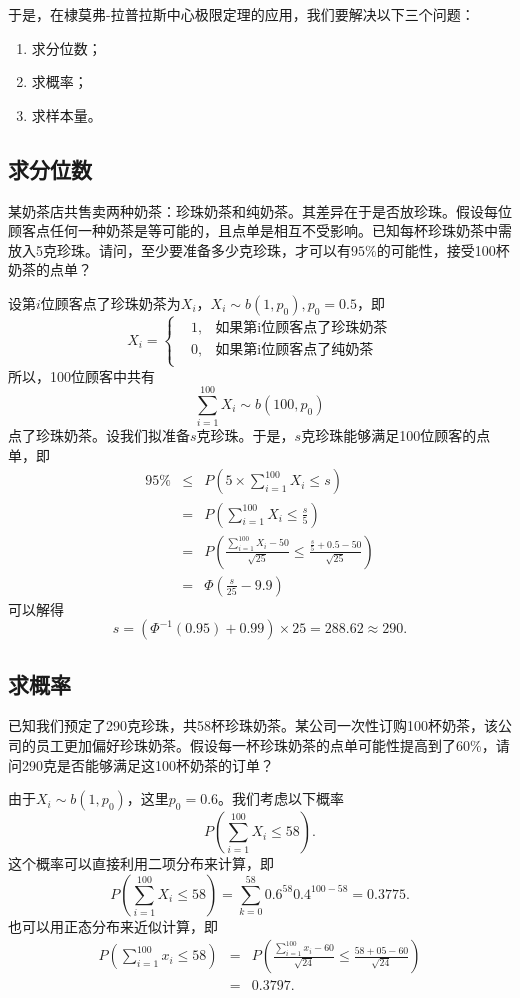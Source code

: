 于是，在棣莫弗-拉普拉斯中心极限定理的应用，我们要解决以下三个问题：
\begin{enumerate}
    \item 求分位数；
    \item 求概率；
    \item 求样本量。
\end{enumerate}
\subsection{求分位数}
\begin{example}
某奶茶店共售卖两种奶茶：珍珠奶茶和纯奶茶。其差异在于是否放珍珠。假设每位顾客点任何一种奶茶是等可能的，且点单是相互不受影响。已知每杯珍珠奶茶中需放入5克珍珠。请问，至少要准备多少克珍珠，才可以有$95\%$的可能性，接受100杯奶茶的点单？
\end{example}
\begin{solution}
设第$i$位顾客点了珍珠奶茶为$X_i$，$X_i \sim b(1,p_0),p_0=0.5$，即
 $$X_{i}=\left\{\begin{aligned}
 &1,&\text{如果第i位顾客点了珍珠奶茶}\\
&0,&\text{如果第i位顾客点了纯奶茶}\\
 \end{aligned}\right.$$
 所以，100位顾客中共有
 $$
 \sum_{i=1}^{100}X_i \sim b(100,p_0)
 $$
 点了珍珠奶茶。设我们拟准备$s$克珍珠。于是，$s$克珍珠能够满足100位顾客的点单，即
 \begin{eqnarray*}
      95\% &\leq& P\left(  5\times \sum_{i=1}^{100}X_i \leq s\right)\\
      & = & P\left(   \sum_{i=1}^{100}X_i \leq \frac{s}{5}\right) \\
      & = & P\left(\frac{\sum_{i=1}^{100} X_{i}-50}{\sqrt{25}} \leq \frac{\frac{s}{5}+0.5-50}{\sqrt{25}}\right)\\
      &=& \Phi\left(\frac{s}{25}-9.9\right)
 \end{eqnarray*}
 可以解得
 $$
 s = (\Phi^{-1}(0.95) + 0.99 ) \times 25 = 288.62 \approx 290.
 $$
\end{solution}
\subsection{求概率}
\begin{example}
已知我们预定了290克珍珠，共58杯珍珠奶茶。某公司一次性订购100杯奶茶，该公司的员工更加偏好珍珠奶茶。假设每一杯珍珠奶茶的点单可能性提高到了60\%，请问290克是否能够满足这100杯奶茶的订单？
\end{example}
\begin{solution}
由于$X_i\sim b(1,p_0)$，这里$p_0=0.6$。我们考虑以下概率
$$
    P\left( \sum_{i=1}^{100} X_i \leq 58 \right) .
$$    
这个概率可以直接利用二项分布来计算，即
$$
P\left( \sum_{i=1}^{100} X_i \leq 58 \right) = \sum_{k=0}^{58} 0.6^{58} 0.4^{100-58}=0.3775.
$$
也可以用正态分布来近似计算，即
\begin{eqnarray*}
    P\left(\sum_{i=1}^{100} x_{i} \leq 58\right) &=&P\left( \frac{\sum_{i=1}^{100} x_{i}-60}{\sqrt{24}} \leq \frac{58+05-60}{\sqrt{24}} \right)
    \\
    &=& 0.3797.
\end{eqnarray*}
\end{solution}
